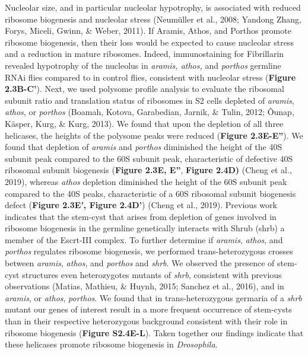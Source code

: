 \documentclass[12pt,oneside]{reedthesis}
\begin{document}
Nucleolar size, and in particular nucleolar hypotrophy, is associated with reduced ribosome biogenesis and nucleolar stress (Neumüller et al., 2008; Yandong Zhang, Forys, Miceli, Gwinn, \& Weber, 2011). If Aramis, Athos, and Porthos promote ribosome biogenesis, then their loss would be expected to cause nucleolar stress and a reduction in mature ribosomes. Indeed, immunostaining for Fibrillarin revealed hypotrophy of the nucleolus in \emph{aramis, athos,} and \emph{porthos} germline RNAi flies compared to in control flies, consistent with nucleolar stress (\textbf{Figure 2.3B-C'}). Next, we used polysome profile analysis to evaluate the ribosomal subunit ratio and translation status of ribosomes in S2 cells depleted of \emph{aramis}, \emph{athos}, or \emph{porthos} (Boamah, Kotova, Garabedian, Jarnik, \& Tulin, 2012; Õunap, Käsper, Kurg, \& Kurg, 2013). We found that upon the depletion of all three helicases, the heights of the polysome peaks were reduced (\textbf{Figure 2.3E-E''}). We found that depletion of \emph{aramis} and \emph{porthos} diminished the height of the 40S subunit peak compared to the 60S subunit peak, characteristic of defective 40S ribosomal subunit biogenesis (\textbf{Figure 2.3E, E''}, \textbf{Figure 2.4D)} (Cheng et al., 2019), whereas \emph{athos} depletion diminished the height of the 60S subunit peak compared to the 40S peaks, characteristic of a 60S ribosomal subunit biogenesis defect (\textbf{Figure 2.3E', Figure 2.4D'}) (Cheng et al., 2019). Previous work indicates that the stem-cyst that arises from depletion of genes involved in ribosome biogenesis in the germline genetically interacts with Shrub (shrb) a member of the Escrt-III complex. To further determine if \emph{aramis}, \emph{athos}, and \emph{porthos} regulates ribosome biogenesis, we performed trans-heterozygous crosses between \emph{aramis}, \emph{athos}, and \emph{porthos} and \emph{shrb}. We observed the presence of stem-cyst structures even heterozygotes mutants of \emph{shrb}, consistent with previous observations (Matias, Mathieu, \& Huynh, 2015; Sanchez et al., 2016), and in \emph{aramis}, or \emph{athos}, \emph{porthos}. We found that in trans-heterozygous germaria of a \emph{shrb} mutant our genes of interest result in a more frequent occurrence of stem-cysts than in their respective heterozygous background consistent with their role in ribosome biogenesis (\textbf{Figure S2.4E-L}). Taken together our findings indicate that these helicases promote ribosome biogenesis in \emph{Drosophila}.
\end{document}
